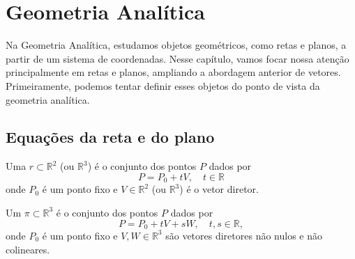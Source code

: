 \documentclass[../main.tex]{subfiles}
\begin{document}
	\section{Geometria Analítica}
		Na Geometria Analítica, estudamos objetos geométricos, como retas e planos, a partir de um sistema de coordenadas. Nesse capítulo, vamos focar nossa atenção principalmente em retas e planos, ampliando a abordagem anterior de vetores. Primeiramente, podemos tentar definir esses objetos do ponto de vista da geometria analítica.
		
		\subsection*{Equações da reta e do plano}
			\begin{definicao}
				Uma  $r \subset \mathbb{R}^2$ (ou $\mathbb{R}^3$) é o conjunto dos pontos $P$
				dados por
				\[
				P = P_0 + t V, \quad t \in \mathbb{R}
				\]
				onde $P_0$ é um ponto fixo e $V\in \mathbb{R}^2$ (ou $\mathbb{R}^3$) é o vetor diretor.
			\end{definicao}
			\begin{definicao}
				Um  $\pi \subset \mathbb{R}^3$ é o conjunto dos pontos $P$ dados por
				\[
				P = P_0 + t V + s W, \quad t, s \in \mathbb{R},
				\]
				onde $P_0$ é um ponto fixo e $V, W \in \mathbb{R}^3$ são vetores diretores
				não nulos e não colineares.
			\end{definicao}
\end{document}
